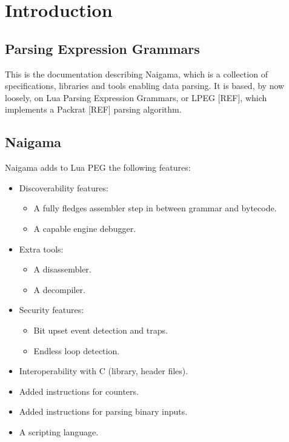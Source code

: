 \section{Introduction}

\subsection{Parsing Expression Grammars}

This is the documentation describing Naigama, which is a collection of
specifications, libraries and tools enabling data parsing. It is based, by
now loosely, on Lua Parsing Expression Grammars, or LPEG [REF], which
implements a Packrat [REF] parsing algorithm.

\subsection{Naigama}

Naigama adds to Lua PEG the following features:

\begin{itemize}
\item Discoverability features:

  \begin{itemize}
  \item A fully fledges assembler step in between grammar and bytecode.
  \item A capable engine debugger.
  \end{itemize}

\item Extra tools:

  \begin{itemize}
  \item A disassembler.
  \item A decompiler.
  \end{itemize}

\item Security features:

  \begin{itemize}
  \item Bit upset event detection and traps.
  \item Endless loop detection.
  \end{itemize}

\item Interoperability with C (library, header files).
\item Added instructions for counters.
\item Added instructions for parsing binary inputs.
\item A scripting language.
\end{itemize}
